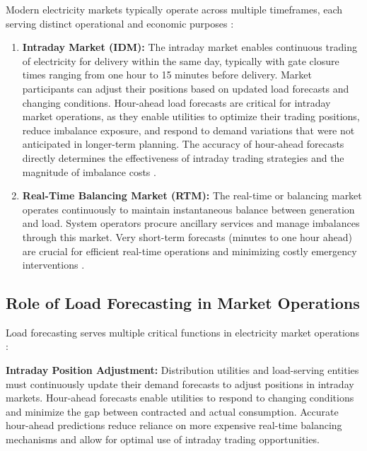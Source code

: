 \documentclass[oneside, 12pt]{book}
\numberwithin{equation}{chapter}
\newcommand{\sizexii}{\fontsize{12pt}{6pt}\selectfont}
\begin{document}
Modern electricity markets typically operate across multiple timeframes, each serving distinct operational and economic purposes \parencite{shahidehpour2002market}:

\begin{enumerate}
    \item \textbf{Intraday Market (IDM):} The intraday market enables continuous trading of electricity for delivery within the same day, typically with gate closure times ranging from one hour to 15 minutes before delivery. Market participants can adjust their positions based on updated load forecasts and changing conditions. Hour-ahead load forecasts are critical for intraday market operations, as they enable utilities to optimize their trading positions, reduce imbalance exposure, and respond to demand variations that were not anticipated in longer-term planning. The accuracy of hour-ahead forecasts directly determines the effectiveness of intraday trading strategies and the magnitude of imbalance costs \parencite{zareipour2010electricity}.
        
    \item \textbf{Real-Time Balancing Market (RTM):} The real-time or balancing market operates continuously to maintain instantaneous balance between generation and load. System operators procure ancillary services and manage imbalances through this market. Very short-term forecasts (minutes to one hour ahead) are crucial for efficient real-time operations and minimizing costly emergency interventions \parencite{hobbs2001evaluation}.
\end{enumerate}

\subsection{\sizexii Role of Load Forecasting in Market Operations}

Load forecasting serves multiple critical functions in electricity market operations \parencite{hong2016energy, conejo2010decision}:

\textbf{Intraday Position Adjustment:} Distribution utilities and load-serving entities must continuously update their demand forecasts to adjust positions in intraday markets. Hour-ahead forecasts enable utilities to respond to changing conditions and minimize the gap between contracted and actual consumption. Accurate hour-ahead predictions reduce reliance on more expensive real-time balancing mechanisms and allow for optimal use of intraday trading opportunities.
\end{document}
